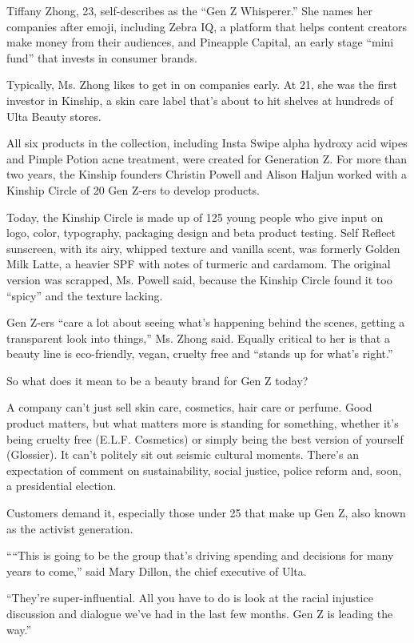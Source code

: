 Tiffany Zhong, 23, self-describes as the ``Gen Z Whisperer.'' She names
her companies after emoji, including Zebra IQ, a platform that helps
content creators make money from their audiences, and Pineapple Capital,
an early stage ``mini fund'' that invests in consumer brands.

Typically, Ms. Zhong likes to get in on companies early. At 21, she was
the first investor in Kinship, a skin care label that's about to hit
shelves at hundreds of Ulta Beauty stores.

All six products in the collection, including Insta Swipe alpha hydroxy
acid wipes and Pimple Potion acne treatment, were created for Generation
Z. For more than two years, the Kinship founders Christin Powell and
Alison Haljun worked with a Kinship Circle of 20 Gen Z-ers to develop
products.

Today, the Kinship Circle is made up of 125 young people who give input
on logo, color, typography, packaging design and beta product testing.
Self Reflect sunscreen, with its airy, whipped texture and vanilla
scent, was formerly Golden Milk Latte, a heavier SPF with notes of
turmeric and cardamom. The original version was scrapped, Ms. Powell
said, because the Kinship Circle found it too ``spicy'' and the texture
lacking.

Gen Z-ers ``care a lot about seeing what's happening behind the scenes,
getting a transparent look into things,'' Ms. Zhong said. Equally
critical to her is that a beauty line is eco-friendly, vegan, cruelty
free and ``stands up for what's right.''

So what does it mean to be a beauty brand for Gen Z today?

A company can't just sell skin care, cosmetics, hair care or perfume.
Good product matters, but what matters more is standing for something,
whether it's being cruelty free (E.L.F. Cosmetics) or simply being the
best version of yourself (Glossier). It can't politely sit out seismic
cultural moments. There's an expectation of comment on sustainability,
social justice, police reform and, soon, a presidential election.

Customers demand it, especially those under 25 that make up Gen Z, also
known as the activist generation.

````This is going to be the group that's driving spending and decisions
for many years to come,'' said Mary Dillon, the chief executive of Ulta.

``They're super-influential. All you have to do is look at the racial
injustice discussion and dialogue we've had in the last few months. Gen
Z is leading the way.''

